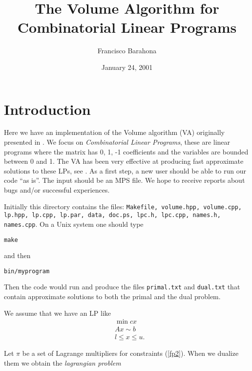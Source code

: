 \documentclass{article}
\begin{document}


\title{\bf The Volume Algorithm for Combinatorial Linear Programs}
\author{Francisco Barahona}
\date{January 24, 2001}
\maketitle

\section{Introduction}

Here we have an implementation of the Volume algorithm (VA) originally
presented in \cite{BA}. We focus on {\it Combinatorial Linear Programs},
these are linear programs where the matrix has 0, 1, -1 coefficients
and the variables are bounded between 0 and 1. The VA has been very
effective at producing fast approximate solutions to these LPs, see
\cite{BA2}.
As a first step, a new user should be able to run our code ``as is''.
The input should be an MPS file.
We hope to receive reports about bugs and/or
successful experiences.

\smallskip

Initially this directory contains the files: {\tt Makefile, volume.hpp,
volume.cpp, lp.hpp, lp.cpp, lp.par, data, doc.ps, lpc.h, lpc.cpp,
names.h, names.cpp}. On a Unix system one
should type
\begin{center} {\tt make} \end{center}

\noindent and then

\begin{center} {\tt bin/myprogram} \end{center}

\noindent Then the code would run and produce the files {\tt primal.txt}
and {\tt dual.txt} that contain approximate solutions to both the primal
and the dual problem.

\smallskip

We assume that we have an LP like
\begin{eqnarray}
&\min c x  \label{fp1} \\
&Ax \sim b \label{fp2} \\
&l \leq x \le u. \label{fp3} 
\end{eqnarray}

Let $\pi$ be a set of
Lagrange multipliers for constraints (\ref{fp2}). When we dualize 
them we obtain the {\it lagrangian problem}
\end{document}
